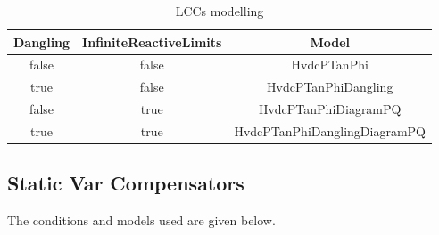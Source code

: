 \documentclass[a4paper, 12pt]{report}
\begin{document}
\begin{table}[ht!]
\center
\begin{tabular}{ c | c | c }
\toprule
\small{\textbf{{Dangling}}}& \small{\textbf{{InfiniteReactiveLimits}}} & \small{\textbf{{Model}}} \\
\midrule
\rowcolor{white}
 \small{false} & \small{false}  & \small{HvdcPTanPhi} \\
\rowcolor{gray!10}
 \small{true} & \small{false}& \small{HvdcPTanPhiDangling} \\
\rowcolor{white}
 \small{false} & \small{true}& \small{HvdcPTanPhiDiagramPQ} \\
\rowcolor{gray!10}
 \small{true} & \small{true} & \small{HvdcPTanPhiDanglingDiagramPQ} \\
\bottomrule
\end{tabular}
\caption{LCCs modelling}
\end{table}

\subsection{Static Var Compensators}

The conditions and models used are given below.
\end{document}
